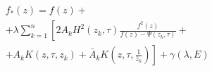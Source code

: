 \documentclass[10pt]{article}
\begin{document}
\[

\begin{aligned}

& f_{*}(z)=f(z)+ \\

&+\lambda \sum_{k=1}^{n}\left[2 A_{k} H^{2}\left(z_{k}, \tau\right) \frac{f^{2}(z)}{f(z)-\Psi\left(z_{k}, \tau\right)}+\right. \\

&+\left.A_{k} K\left(z, \tau, z_{k}\right)+\bar{A}_{k} K\left(z, \tau, \frac{1}{\bar{z}_{k}}\right)\right]+\gamma(\lambda, E)

\end{aligned}

\]
\end{document}
